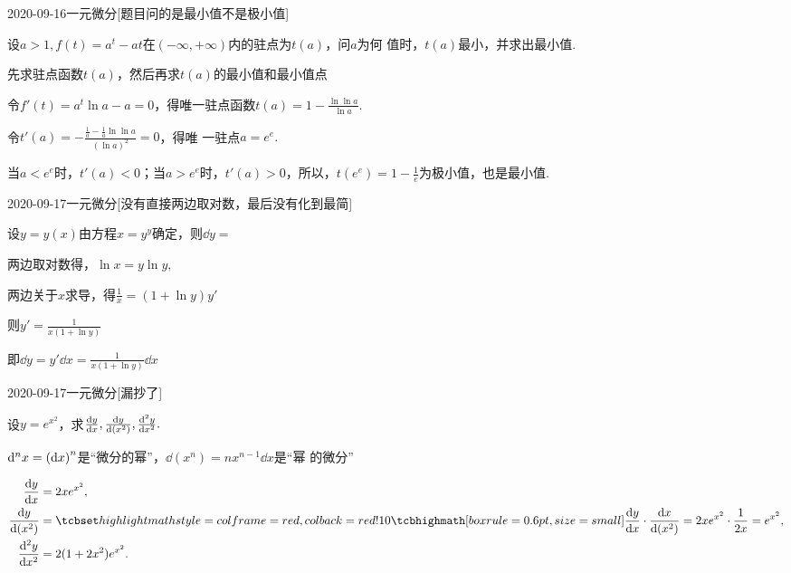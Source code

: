 \documentclass{ctexart}
\begin{document}
\begin{mathques}{2020-09-16}{一元微分}[题目问的是最小值不是极小值]
\begin{ques}
  设$a > 1, f(t) = a^t - at$在$(-\infty, +\infty)$内的驻点为$t(a)$，问$a$为何
  值时，$t(a)$最小，并求出最小值.
\end{ques}
\begin{solu}
  \begin{mathideabox}
    先求驻点函数$t(a)$，然后再求$t(a)$的最小值和最小值点
  \end{mathideabox}
  令$f'(t) = a^t\ln a - a = 0$，得唯一驻点函数$t(a) = 1 - \frac{\ln\ln a}{\ln
  a}.$

  令$t'(a) = - \frac{\frac{1}{a} - \frac{1}{a}\ln \ln a}{(\ln a)^2} = 0$，得唯
  一驻点$a = e^e.$

  当$a < e^e$时，$t'(a) < 0$；当$a > e^e$时，$t'(a) > 0$，所以，$t(e^e) = 1 -
  \frac{1}{e}$为极小值，也是最小值.
\end{solu}
\end{mathques}

\begin{mathques}{2020-09-17}{一元微分}[没有直接两边取对数，最后没有化到最简]
\begin{ques}
  设$y = y(x)$由方程$x = y^y$确定，则$\dd y = $\mathblank
\end{ques}
\begin{solu}

  两边取对数得，$\ln x = y\ln y,$

  两边关于$x$求导，得$\frac{1}{x} = (1 + \ln y) y'$

  则$y' = \frac{1}{x (1 + \ln y)}$

  即$\dd y = y' \dd x = \frac{1}{x(1 + \ln y)}\dd x$
\end{solu}
\end{mathques}

\begin{mathques}{2020-09-17}{一元微分}[漏抄了]
\begin{ques}
  设$y = e^{x^2}$，求$\dv{y}{x}, \dv{y}{(x^2)}, \dv[2]{y}{x}.$
\end{ques}
\begin{solu}
  \begin{mathideabox}[区分微分符号]
    $\dd[n]x = \qty(\dd x)^n$是“微分的幂”，$\dd (x^n) = nx^{n - 1}\dd x$是“幂
    的微分”
  \end{mathideabox}
  \begin{align*}
    \dv{y}{x} &= 2xe^{x^2},\\
    \dv{y}{(x^2)} &= \matherror{\dv{y}{x}\cdot \dv{x}{(x^2)}} = 2xe^{x^2}\cdot
    \frac{1}{2x} = e^{x^2},\\
    \dv[2]{y}{x} &= 2(1 + 2x^2)e^{x^2}.
  \end{align*}
\end{solu}
\end{mathques}
\end{document}
